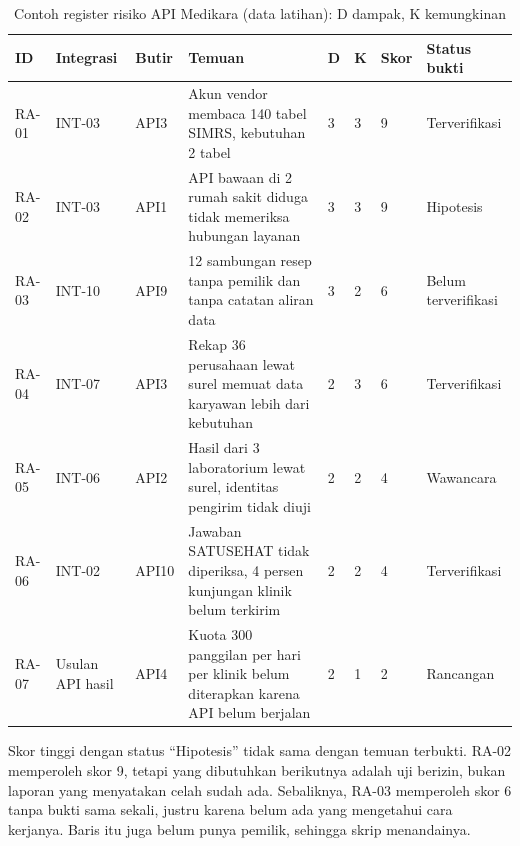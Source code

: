 \begin{table}[!htb]
  \centering
  \caption{Contoh register risiko API Medikara (data latihan): D dampak, K kemungkinan}
  \label{tab:ch06-register}
  \footnotesize
  \begin{tabularx}{\textwidth}{T{0.9cm}T{1.3cm}T{0.9cm}QT{0.2cm}T{0.2cm}T{0.7cm}T{1.7cm}}
    \hline
    \textbf{ID} & \textbf{Integrasi} & \textbf{Butir} & \textbf{Temuan} & \textbf{D} & \textbf{K} & \textbf{Skor} & \textbf{Status bukti} \\ \hline
    RA-01 & INT-03 & API3 & Akun vendor membaca 140 tabel SIMRS, kebutuhan 2 tabel & 3 & 3 & 9 & Terverifikasi \\ \hline
    RA-02 & INT-03 & API1 & API bawaan di 2 rumah sakit diduga tidak memeriksa hubungan layanan & 3 & 3 & 9 & Hipotesis \\ \hline
    RA-03 & INT-10 & API9 & 12 sambungan resep tanpa pemilik dan tanpa catatan aliran data & 3 & 2 & 6 & Belum terverifikasi \\ \hline
    RA-04 & INT-07 & API3 & Rekap 36 perusahaan lewat surel memuat data karyawan lebih dari kebutuhan & 2 & 3 & 6 & Terverifikasi \\ \hline
    RA-05 & INT-06 & API2 & Hasil dari 3 laboratorium lewat surel, identitas pengirim tidak diuji & 2 & 2 & 4 & Wawancara \\ \hline
    RA-06 & INT-02 & API10 & Jawaban SATUSEHAT tidak diperiksa, 4 persen kunjungan klinik belum terkirim & 2 & 2 & 4 & Terverifikasi \\ \hline
    RA-07 & Usulan API hasil & API4 & Kuota 300 panggilan per hari per klinik belum diterapkan karena API belum berjalan & 2 & 1 & 2 & Rancangan \\ \hline
  \end{tabularx}
\end{table}

Skor tinggi dengan status ``Hipotesis'' tidak sama dengan temuan terbukti. RA-02 memperoleh skor 9, tetapi yang dibutuhkan
berikutnya adalah uji berizin, bukan laporan yang menyatakan celah sudah ada. Sebaliknya, RA-03 memperoleh skor 6 tanpa bukti
sama sekali, justru karena belum ada yang mengetahui cara kerjanya. Baris itu juga belum punya pemilik, sehingga skrip
 menandainya.

